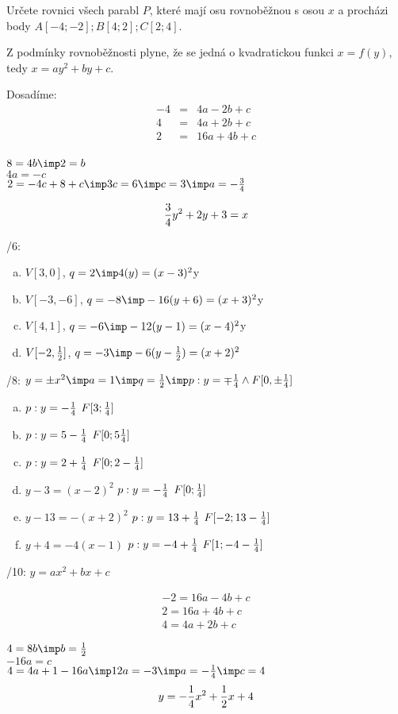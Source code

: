
\BeginDoc{}

\Pr Určete rovnici všech parabl $P$, které mají osu rovnoběžnou s osou $x$ a procházi body $A[-4;-2];B[4;2];C[2;4]$.

Z podmínky rovnoběžnosti plyne, že se jedná o kvadratickou funkci $x = f(y)$, tedy $x = a y^2 + by + c$.

Dosadíme:
\begin{eqnarray}
	-4 &=& 4a -2 b +c \\
	 4 &=& 4a +2 b +c\\
	 2 &=& 16a + 4b +c\\
\end{eqnarray}

$ 8 =  4b \imp 2 = b$\\
$ 4a = - c$\\
$ 2 =  - 4c + 8 + c \imp 3c = 6 \imp c = 3  \imp a  = - \f 3 4$

$$ \frac 3 4 y^2 + 2 y + 3 = x$$

/6:
\begin{enumerate}[a)]
	\item $V[3,0]$, $q = 2 \imp 4(y)= (x-3)^2$y
	\item $V[-3,-6]$, $q = -8 \imp -16(y+6)= (x+3)^2$y
	\item $V[4,1]$, $q = -6 \imp -12(y-1)= (x-4)^2$y
	\item $V[-2,\frac 1 2]$, $q = -3 \imp -6(y-\f 12)= (x+2)^2$
\end{enumerate}

/8:
$y = \pm x^2 \imp a = 1\imp q = \f 1 2 \imp p: y = \mp \f 1 4 \land F[0,\pm \f 1 4]$

\begin{enumerate}[a)]
	\item $p:y = -\frac 1 4$ $F[3;\frac 1 4]$
	\item $p:y = 5-\frac 1 4$ $F[0;5\frac 1 4]$
	\item $p:y = 2+\frac 1 4$ $F[0;2-\frac 1 4]$
	\item $y-3 = (x-2)^2$
		$p:y = -\frac 1 4$ $F[0;\frac 1 4]$
	\item $ y - 13  =  - (x+2)^2 $
		$p:y = 13+\frac 1 4$ $F[-2;13-\frac 1 4]$
	\item $y + 4 = -4(x-1)$
		$p:y = -4+\frac 1 4$ $F[1;-4-\frac 1 4]$
\end{enumerate}

/10:
$y  =  a x^2 + b x + c $

\begin{eqnarray}
	-2 = 16 a - 4 b + c\\
	2 = 16 a + 4 b + c \\
	4 = 4 a + 2 b  + c
\end{eqnarray}

$4 = 8 b \imp b = \f 12$\\
$-16a = c$\\
$4 = 4a +1 -16 a \imp 12 a = -3 \imp a = -\f 14 \imp c=4$
$$ y = - \frac 14 x^2 + \frac 12 x + 4$$
\EndDoc

